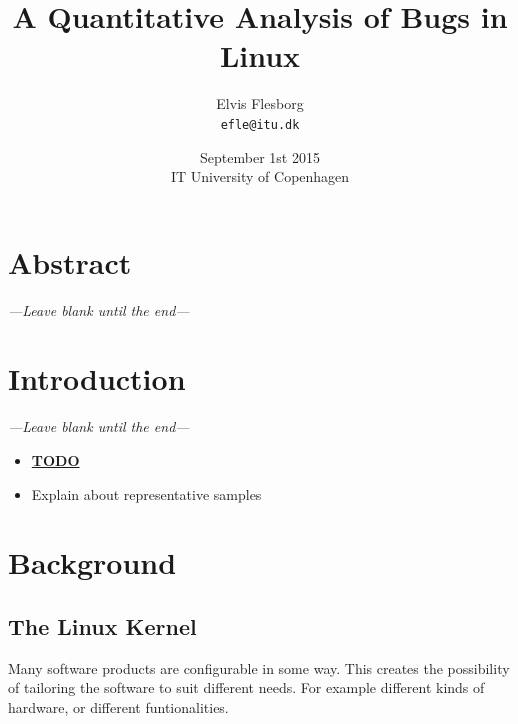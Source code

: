 \documentclass[a4paper,11pt]{article}
\begin{document}
\setlength{\parindent}{0cm}
\setlength{\unitlength}{1mm}

\date{September 1st 2015\\ IT University of Copenhagen}
\title{A Quantitative Analysis of Bugs in Linux}
\author{Elvis Flesborg\\
\texttt{efle@itu.dk}}
\clearpage\maketitle
\thispagestyle{empty}
\newpage

\tableofcontents
\thispagestyle{empty}



\newpage

\setcounter{page}{1}

\section{Abstract}
\emph{---Leave blank until the end---}

\section{Introduction}
\emph{---Leave blank until the end---}


\begin{itemize}
    \item \underline{\textbf{TODO}}
        \item Explain about representative samples
\end{itemize}


\newpage
\section{Background}

\subsection{The Linux Kernel}

Many software products are configurable in some way. This creates the 
possibility of tailoring the software to suit different needs. For example 
different kinds of hardware, or different funtionalities.
\end{document}
